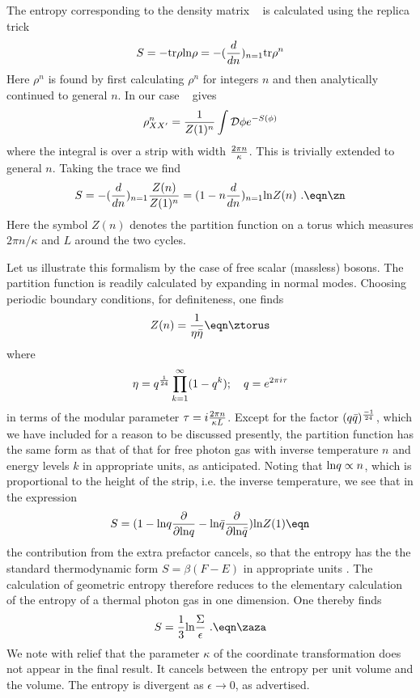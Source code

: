 The entropy corresponding to the density matrix \rhob~
is calculated using the replica trick
$$
S = - {\rm tr} \rho{\rm ln}\rho =
- ({d\over dn})_{n=1}{\rm tr}\rho^{n}
$$
Here $\rho^n$ is found by first calculating $\rho^n$ for
integers $n$ and then analytically continued to general $n$.
In our case \rhob~ gives
$$
\rho^n_{XX^{\prime}}= {1\over Z(1)^n} \int {\cal D}\phi e^{-S(\phi)}
$$
where the integral is over a strip with width ${2\pi n}\over\kappa$.
This is trivially extended to general $n$. Taking the trace we find
$$
S= - ({d\over dn})_{n=1}
{Z(n)\over Z(1)^n}= (1-n
{d\over dn})_{n=1}{\rm ln}Z(n)~.
\eqn\zn
$$
Here the symbol $Z(n)$ denotes the
partition function on a torus which measures $2\pi n/\kappa$
and $L$ around the two cycles.


Let us illustrate this formalism by the case of
free scalar (massless) bosons. The
partition function is readily calculated
by expanding in normal modes. Choosing periodic boundary
conditions, for definiteness, one finds
$$
Z(n)= {1\over\eta\bar\eta}
\eqn\ztorus
$$
where
$$
\eta = q^{1\over 24}\prod^{\infty}_{k=1}(1-q^k);~~~q=e^{2\pi i\tau}
$$
in terms of the modular parameter $\tau=i {2\pi n\over\kappa L}$.
Except for the factor $(q\bar q)^{-1\over 24}$, which we have included
for a reason to be discussed presently,
the partition function has the same form as that
of that for
free photon gas with inverse temperature $n$ and energy levels
$k$ in
appropriate units, as anticipated.
Noting that ${\rm ln}q\propto n$, which is proportional to the
height of the strip, i.e. the inverse temperature,  we see that
in the expression
$$
S = (1-{\rm ln}q{\partial\over\partial {\rm ln}q}
-{\rm ln}\bar q{\partial\over\partial {\rm ln}\bar q})
{\rm ln}Z (1)
\eqn\sc
$$
the contribution from the extra prefactor cancels, so that
the entropy has the
the standard thermodynamic form $S=\beta(F-E)$ in appropriate units
.
The calculation of geometric entropy therefore
reduces to the elementary calculation of the entropy of a thermal photon
gas in one dimension.  One thereby finds
$$
S = {1\over 3}{\rm ln}{\Sigma\over\epsilon}~.
\eqn\zaza
$$
We note with relief that the parameter $\kappa$ of the
coordinate transformation does not appear in the final result.  It cancels
between the entropy per unit volume and the volume.
The entropy is divergent as $\epsilon\rightarrow 0$, as advertised.

